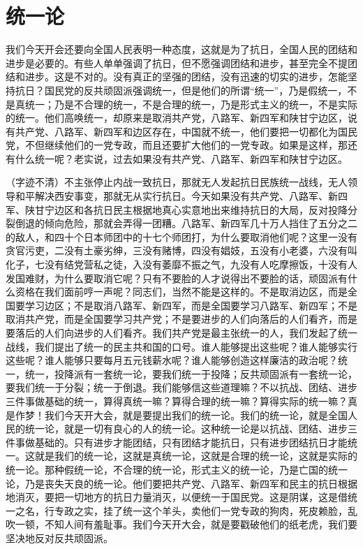 \section[统一论]{统一论}


我们今天开会还要向全国人民表明一种态度，这就是为了抗日，全国人民的团结和进步是必要的。有些人单单强调了抗日，但不愿强调团结和进步，甚至完全不提团结和进步。这是不对的。没有真正的坚强的团结，没有迅速的切实的进步，怎能坚持抗日？国民党的反共顽固派强调统一，但是他们的所谓“统一”，乃是假统一，不是真统一；乃是不合理的统一，不是合理的统一，乃是形式主义的统一，不是实际的统一。他们高唤统一，却原来是取消共产党，八路军、新四军和陕甘宁边区，说有共产党、八路军、新四军和边区存在，中国就不统一，他们要把一切都化为国民党，不但继续他们的一党专政，而且还要扩大他们的一党专政。如果是这样，那还有什么统一呢？老实说，过去如果没有共产党、八路军、新四军和陕甘宁边区。

（字迹不清）不主张停止内战一致抗日，那就无人发起抗日民族统一战线，无人领导和平解决西安事变，那就无从实行抗日。今天如果没有共产党、八路军、新四军、陕甘宁边区和各抗日民主根据地真心实意地出来维持抗日的大局，反对投降分裂倒退的倾向危险，那就会弄得一团糟。八路军、新四军几十万人挡住了五分之二的敌人，和四十个日本师团中的十七个师团打，为什么要取消他们呢？这里一没有贪官污吏，二没有土豪劣绅，三没有赌博，四没有娼妓，五没有小老婆，六没有叫化子，七没有结党营私之徒，入没有萎靡不振之气，九没有人吃摩擦饭，十没有人发国难财，为什么要取消它呢？只有不要脸的人才说得出不要脸的话，顽固派有什么资格在我们面前哼一声呢？同志们，当然不能是这样的。不是取消边区，而是全国要学习边区；不是取消八路军、新四军，而是全国要学习八路军、新四军；不是取消共产党，而是全国要学习共产党；不是要进步的人们向落后的人们看齐，而是要落后的人们向进步的人们看齐。我们共产党是最主张统一的人，我们发起了统一战线，我们提出了统一的民主共和国的口号。谁人能够提出这些呢？谁人能够实行这些呢？谁人能够只要每月五元钱薪水呢？谁人能够创造这样廉洁的政治呢？统一，统一，投降派有一套统一论，要我们统一于投降；反共顽固派有一套统一论，要我们统一于分裂；统一于倒退。我们能够信这些道理嘛？不以抗战、团结、进步三件事做基础的统一，算得真统一嘛？算得合理的统一嘛？算得实际的统一嘛？真是作梦！我们今天开大会，就是要提出我们的统一论。我们的统一论，就是全国人民的统一论，就是一切有良心的人的统一论。这种统一论是以抗战、团结、进步三件事做基础的。只有进步才能团结，只有团结才能抗日，只有进步团结抗日才能统一。这就是我们的统一论，这就是真统一论，这就是合理的统一论，这就是实际的统一论。那种假统一论，不合理的统一论，形式主义的统一论，乃是亡国的统一论，乃是丧失天良的统一论。他们要把共产党、八路军、新四军和民主的抗日根据地消灭，要把一切地方的抗日力量消灭，以便统一于国民党。这是阴谋，这是借统一之名，行专政之实，挂了统一这个羊头，卖他们一党专政的狗肉，死皮赖脸，乱吹一顿，不知人间有羞耻事。我们今天开大会，就是要戳破他们的纸老虎，我们要坚决地反对反共顽固派。

